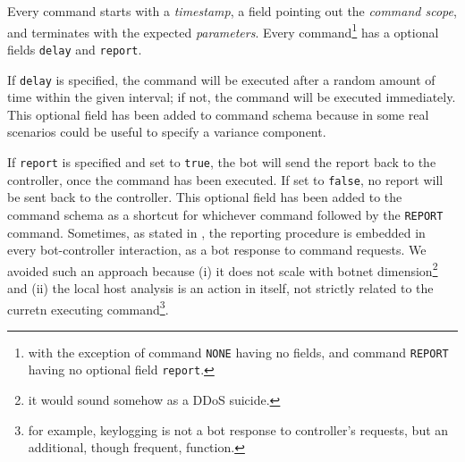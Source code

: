 Every command starts with a \textit{timestamp}, a field pointing out the \textit{command scope}, and terminates with the expected \textit{parameters}.
Every command\footnote{with the exception of command \texttt{NONE} having no fields, and command \texttt{REPORT} having no optional field \texttt{report}.}  has a optional fields \texttt{delay} and \texttt{report}.

If \texttt{delay} is specified, the command will be executed after a random amount of time within the given interval; if not, the command will be executed immediately. This optional field has been added to command schema because in some real scenarios could be useful to specify a variance component.

If \texttt{report} is specified and set to \texttt{true}, the bot will send the report back to the controller, once the command has been executed. If set to \texttt{false}, no report will be sent back to the controller. This optional field has been added to the command schema as a shortcut for whichever command followed by the \texttt{REPORT} command. Sometimes, as stated in \cite{build-your-own-botnet}, the reporting procedure is embedded in every bot-controller interaction, as a bot response to command requests. We avoided such an approach because (i) it does not scale with botnet dimension\footnote{it would sound somehow as a DDoS suicide.} and (ii) the local host analysis is an action in itself, not strictly related to the curretn executing command\footnote{for example, keylogging is not a bot response to controller's requests, but an additional, though frequent, function.}.

